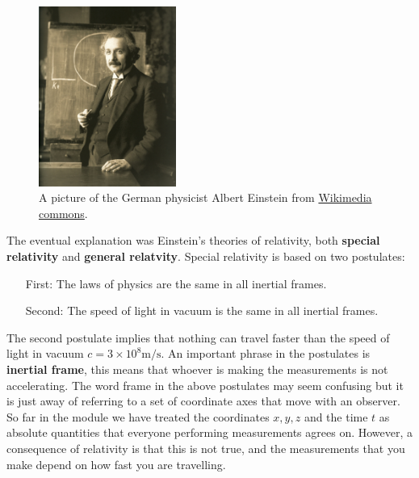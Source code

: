 \documentclass[a4paper,12pt]{book}
\begin{document}
\begin{figure}[ht]
    \centering
    \includegraphics[width=0.4\textwidth]{figures/Einstein_1921_by_F_Schmutzer_-_restoration.jpg}
    \caption{A picture of the German physicist Albert Einstein from \href{https://upload.wikimedia.org/wikipedia/commons/3/3e/Einstein_1921_by_F_Schmutzer_-_restoration.jpg}{Wikimedia commons}.}
\end{figure}

The eventual explanation was Einstein's theories of relativity, both \textbf{special relativity} and \textbf{general relatvity}.  Special relativity is based on two postulates:
\begin{itemize}
\setlength{\itemsep}{-5pt}
    \item[First:] The laws of physics are the same in all inertial frames.
    \item[Second:] The speed of light in vacuum is the same in all inertial frames.
\end{itemize}  

The second postulate implies that nothing can travel faster than the speed of light in vacuum $c=3\times 10^{8}\text{m/s}$. An important phrase in the postulates is \textbf{inertial frame}, this means that whoever is making the measurements is not accelerating. The word frame in the above postulates may seem confusing but it is just away of referring to a set of coordinate axes that move with an observer. So far in the module we have treated the coordinates $x,y,z$ and the time $t$ as absolute quantities that everyone performing measurements agrees on. However, a consequence of relativity is that this is not true, and the measurements that you make depend on how fast you are travelling.\\
\end{document}
